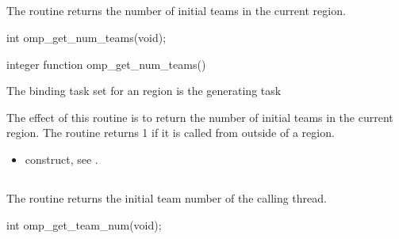 \subsection{}
\label{subsec:omp_get_num_teams}
\summary
The  routine returns the number of initial teams in the current 
region.

\format
\begin{ccppspecific}
\begin{ompcFunction}
int omp_get_num_teams(void);
\end{ompcFunction}
\end{ccppspecific}

\begin{fortranspecific}
\begin{ompfFunction}
integer function omp_get_num_teams()
\end{ompfFunction}
\end{fortranspecific}

\binding
The binding task set for an  region is the generating task

\effect
The effect of this routine is to return the number of initial teams in the current  region.
The routine returns 1 if it is called from outside of a  region.

\crossreferences
\begin{itemize}
\item {} construct, see
.
\end{itemize}











\subsection{}
\label{subsec:omp_get_team_num}
\summary
The  routine returns the initial team number of the calling thread.

\format
\begin{ccppspecific}
\begin{ompcFunction}
int omp_get_team_num(void);
\end{ompcFunction}
\end{ccppspecific}

